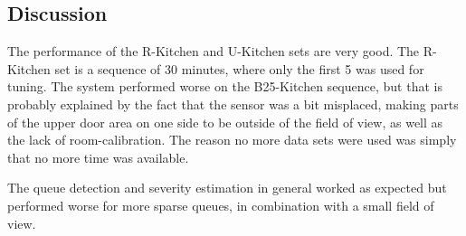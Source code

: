 \subsection{Discussion}
The performance of the R-Kitchen and U-Kitchen sets are very good. The R-Kitchen set is a sequence of 30 minutes, where only the first 5 was used for tuning. The system performed worse on the B25-Kitchen sequence, but that is probably explained by the fact that the sensor was a bit misplaced, making parts of the upper door area on one side to be outside of the field of view, as well as the lack of room-calibration. The reason no more data sets were used was simply that no more time was available.

The queue detection and severity estimation in general worked as expected but performed worse for more sparse queues, in combination with a small field of view.  


